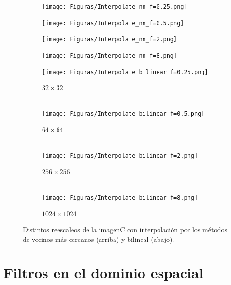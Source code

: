 \documentclass[11pt,twocolumn,twoside]{opticajnl}
\begin{document}
\begin{figure}[h]
    \centering
        \begin{subfigure}[h]{0.24\linewidth}
            \centering
            \texttt{[image: Figuras/Interpolate\_nn\_f=0.25.png]} 
        \end{subfigure}
        \begin{subfigure}[h]{0.24\linewidth}
            \centering
            \texttt{[image: Figuras/Interpolate\_nn\_f=0.5.png]}
        \end{subfigure}
        \begin{subfigure}[h]{0.24\linewidth}
            \centering
            \texttt{[image: Figuras/Interpolate\_nn\_f=2.png]}
        \end{subfigure}
        \begin{subfigure}[h]{0.24\linewidth}
            \centering
            \texttt{[image: Figuras/Interpolate\_nn\_f=8.png]}
        \end{subfigure}
         \begin{subfigure}[h]{0.24\linewidth}
            \centering
            \texttt{[image: Figuras/Interpolate\_bilinear\_f=0.25.png]}
            \caption{$32\times32$ \\
            $~$} 
         \end{subfigure}
         \begin{subfigure}[h]{0.24\linewidth}
            \centering
            \texttt{[image: Figuras/Interpolate\_bilinear\_f=0.5.png]}
            \caption{$64\times64$ \\
            $~$} 
         \end{subfigure}
         \begin{subfigure}[h]{0.24\linewidth}
            \centering
            \texttt{[image: Figuras/Interpolate\_bilinear\_f=2.png]}
            \caption{$256\times256$ \\
            $~$} 
         \end{subfigure}
         \begin{subfigure}[h]{0.24\linewidth}
            \centering
            \texttt{[image: Figuras/Interpolate\_bilinear\_f=8.png]}
            \caption{$1024\times1024$} 
         \end{subfigure}
    \caption{Distintos reescaleos de la imagenC con interpolación por los métodos de vecinos más cercanos (arriba) y bilineal (abajo).}
    \label{fig:Interpolate}
\end{figure}

\section{Filtros en el dominio espacial\label{sec:ej4}}
\end{document}
